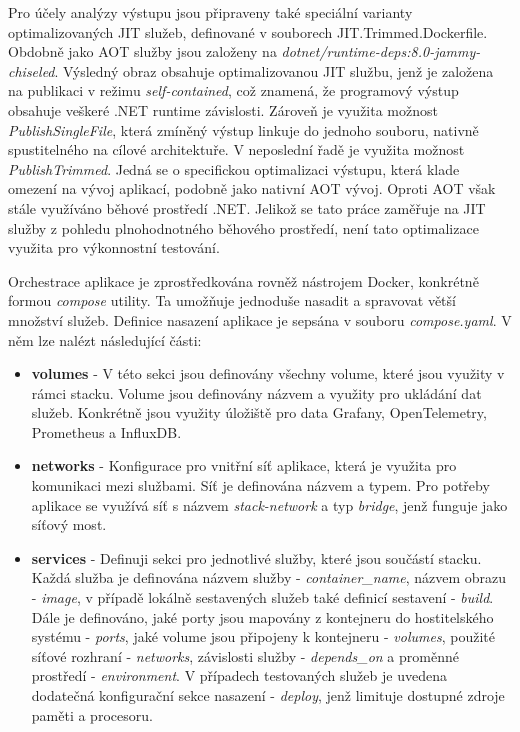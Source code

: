 Pro účely analýzy výstupu jsou připraveny také speciální varianty optimalizovaných JIT služeb, definované v souborech JIT.Trimmed.Dockerfile. Obdobně jako AOT služby jsou založeny na \emph{dotnet/runtime-deps:8.0-jammy-chiseled}. Výsledný obraz obsahuje optimalizovanou JIT službu, jenž je založena na publikaci v režimu \emph{self-contained}, což znamená, že programový výstup obsahuje veškeré .NET runtime závislosti. Zároveň je využita možnost \emph{PublishSingleFile}, která zmíněný výstup linkuje do jednoho souboru, nativně spustitelného na cílové architektuře. V neposlední řadě je využita možnost \emph{PublishTrimmed}. Jedná se o specifickou optimalizaci výstupu, která klade omezení na vývoj aplikací, podobně jako nativní AOT vývoj. Oproti AOT však stále využíváno běhové prostředí .NET. Jelikož se tato práce zaměřuje na JIT služby z pohledu plnohodnotného běhového prostředí, není tato optimalizace využita pro výkonnostní testování.


Orchestrace aplikace je zprostředkována rovněž nástrojem Docker, konkrétně formou \emph{compose} utility. Ta umožňuje jednoduše nasadit a spravovat větší množství služeb. Definice nasazení aplikace je sepsána v souboru \emph{compose.yaml}. V něm lze nalézt následující části:

\begin{itemize}
  \item \textbf{volumes} - V této sekci jsou definovány všechny volume, které jsou využity v rámci stacku. Volume jsou definovány názvem a využity pro ukládání dat služeb. Konkrétně jsou využity úložiště pro data Grafany, OpenTelemetry, Prometheus a InfluxDB.
  \item \textbf{networks} - Konfigurace pro vnitřní síť aplikace, která je využita pro komunikaci mezi službami. Síť je definována názvem a typem. Pro potřeby aplikace se využívá síť s názvem \emph{stack-network} a typ \emph{bridge}, jenž funguje jako síťový most.
  \item \textbf{services} - Definuji sekci pro jednotlivé služby, které jsou součástí stacku. Každá služba je definována názvem služby - \emph{container\_name}, názvem obrazu - \emph{image}, v případě lokálně sestavených služeb také definicí sestavení - \emph{build}. Dále je definováno, jaké porty jsou mapovány z kontejneru do hostitelského systému - \emph{ports}, jaké volume jsou připojeny k kontejneru - \emph{volumes}, použité síťové rozhraní - \emph{networks}, závislosti služby - \emph{depends\_on} a proměnné prostředí - \emph{environment}. V případech testovaných služeb je uvedena dodatečná konfigurační sekce nasazení - \emph{deploy}, jenž limituje dostupné zdroje paměti a procesoru.
\end{itemize}


